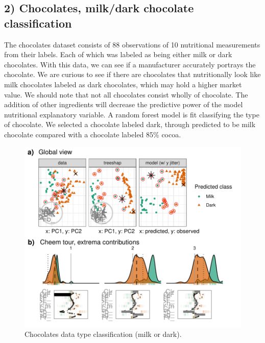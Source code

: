 \documentclass[
  article]{article}
\begin{document}
\hypertarget{chocolates-milkdark-chocolate-classification}{%
\subsection{2) Chocolates, milk/dark chocolate classification}\label{chocolates-milkdark-chocolate-classification}}

The chocolates dataset consists of 88 observations of 10 nutritional measurements from their labels. Each of which was labeled as being either milk or dark chocolates. With this data, we can see if a manufacturer accurately portrays the chocolate. We are curious to see if there are chocolates that nutritionally look like milk chocolates labeled as dark chocolates, which may hold a higher market value. We should note that not all chocolates consist wholly of chocolate. The addition of other ingredients will decrease the predictive power of the model nutritional explanatory variable. A random forest model is fit classifying the type of chocolate. We selected a chocolate labeled dark, through predicted to be milk chocolate compared with a chocolate labeled 85\% cocoa.

\begin{figure}

{\centering \includegraphics[width=1\linewidth]{./figures/case_chocolates} 

}

\caption{Chocolates data type classification (milk or dark).}\label{fig:casechocolates}
\end{figure}
\end{document}
